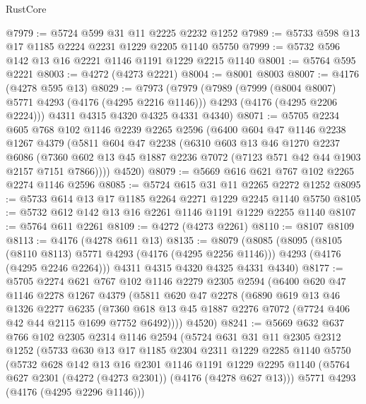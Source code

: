 \begin{lexlean}{RustCore}
\begin{coremodule}
@7979 := @5724 @599 @31 @11 @2225 @2232 @1252
@7989 := @5733 @598 @13 @17 @1185 @2224 @2231 @1229 @2205 @1140 @5750
@7999 := @5732 @596 @142 @13 @16 @2221 @1146 @1191 @1229 @2215 @1140
@8001 := @5764 @595 @2221
@8003 := @4272 (@4273 @2221)
@8004 := @8001 @8003
@8007 := @4176 (@4278 @595 @13)
@8029 := @7973
    (@7979
      (@7989
        (@7999 (@8004 @8007) @5771 @4293 (@4176 (@4295 @2216 @1146)))
        @4293
        (@4176 (@4295 @2206 @2224)))
      @4311
      @4315
      @4320
      @4325
      @4331
      @4340)
@8071 := @5705
    @2234
    @605
    @768
    @102
    @1146
    @2239
    @2265
    @2596
    (@6400
      @604
      @47
      @1146
      @2238
      @1267
      @4379
      (@5811
        @604
        @47
        @2238
        (@6310
          @603
          @13
          @46
          @1270
          @2237
          @6086
          (@7360 @602 @13 @45 @1887 @2236 @7072 (@7123 @571 @42 @44 @1903 @2157 @7151 @7866))))
      @4520)
@8079 := @5669 @616 @621 @767 @102 @2265 @2274 @1146 @2596
@8085 := @5724 @615 @31 @11 @2265 @2272 @1252
@8095 := @5733 @614 @13 @17 @1185 @2264 @2271 @1229 @2245 @1140 @5750
@8105 := @5732 @612 @142 @13 @16 @2261 @1146 @1191 @1229 @2255 @1140
@8107 := @5764 @611 @2261
@8109 := @4272 (@4273 @2261)
@8110 := @8107 @8109
@8113 := @4176 (@4278 @611 @13)
@8135 := @8079
    (@8085
      (@8095
        (@8105 (@8110 @8113) @5771 @4293 (@4176 (@4295 @2256 @1146)))
        @4293
        (@4176 (@4295 @2246 @2264)))
      @4311
      @4315
      @4320
      @4325
      @4331
      @4340)
@8177 := @5705
    @2274
    @621
    @767
    @102
    @1146
    @2279
    @2305
    @2594
    (@6400
      @620
      @47
      @1146
      @2278
      @1267
      @4379
      (@5811
        @620
        @47
        @2278
        (@6890
          @619
          @13
          @46
          @1326
          @2277
          @6235
          (@7360 @618 @13 @45 @1887 @2276 @7072 (@7724 @406 @42 @44 @2115 @1699 @7752 @6492))))
      @4520)
@8241 := @5669
    @632
    @637
    @766
    @102
    @2305
    @2314
    @1146
    @2594
    (@5724
      @631
      @31
      @11
      @2305
      @2312
      @1252
      (@5733
        @630
        @13
        @17
        @1185
        @2304
        @2311
        @1229
        @2285
        @1140
        @5750
        (@5732
          @628
          @142
          @13
          @16
          @2301
          @1146
          @1191
          @1229
          @2295
          @1140
          (@5764 @627 @2301 (@4272 (@4273 @2301)) (@4176 (@4278 @627 @13)))
          @5771
          @4293
          (@4176 (@4295 @2296 @1146)))

\end{coremodule}
\end{lexlean}
